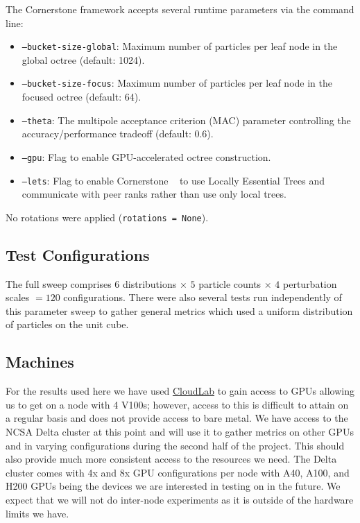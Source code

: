 The Cornerstone framework accepts several runtime parameters via the command line:

\begin{itemize}
    \item \texttt{--bucket-size-global}: Maximum number of particles per leaf node in the global octree (default: 1024).
    \item \texttt{--bucket-size-focus}: Maximum number of particles per leaf node in the focused octree (default: 64).
    \item \texttt{--theta}: The multipole acceptance criterion (MAC) parameter controlling the accuracy/performance tradeoff (default: 0.6).
    \item \texttt{--gpu}: Flag to enable GPU-accelerated octree construction.
    \item \texttt{--lets}: Flag to enable Cornerstone ~\cite{cornerstone} to use Locally Essential Trees and communicate with peer ranks rather than use only local trees.
\end{itemize}

No rotations were applied (\texttt{rotations = None}).

\subsection{Test Configurations}

The full sweep comprises $6$ distributions $\times$ $5$ particle counts $\times$ $4$ perturbation scales $= 120$ configurations. There were also several tests run independently of this parameter sweep to gather general metrics which used a uniform distribution of particles on the unit cube.

\subsection{Machines}
For the results used here we have used \href{https://www.cloudlab.us/}{CloudLab} to gain access to GPUs allowing us to get on a node with 4 V100s; however, access to this is difficult to attain on a regular basis and does not provide access to bare metal. We have access to the NCSA Delta cluster at this point and will use it to gather metrics on other GPUs and in varying configurations during the second half of the project. This should also provide much more consistent access to the resources we need. The Delta cluster comes with 4x and 8x GPU configurations per node with A40, A100, and H200 GPUs being the devices we are interested in testing on in the future. We expect that we will not do inter-node experiments as it is outside of the hardware limits we have.

